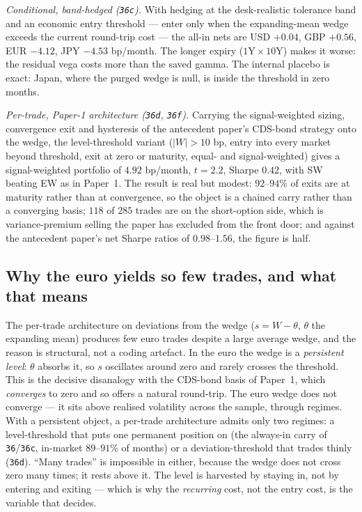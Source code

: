 \documentclass[11pt]{article}
\begin{document}
\emph{Conditional, band-hedged (\texttt{36c}).} With hedging at the desk-realistic tolerance band and
an economic entry threshold --- enter only when the expanding-mean wedge exceeds the current
round-trip cost --- the all-in nets are USD $+0.04$, GBP $+0.56$, EUR $-4.12$, JPY $-4.53$ bp/month.
The longer expiry ($1\mathrm{Y}\times10\mathrm{Y}$) makes it worse: the residual vega costs more than
the saved gamma. The internal placebo is exact: Japan, where the purged wedge is null, is inside the
threshold in zero months.

\emph{Per-trade, Paper-1 architecture (\texttt{36d}, \texttt{36f}).} Carrying the signal-weighted
sizing, convergence exit and hysteresis of the antecedent paper's CDS-bond strategy onto the wedge,
the level-threshold variant ($|W|>10$ bp, entry into every market beyond threshold, exit at zero or
maturity, equal- and signal-weighted) gives a signal-weighted portfolio of $4.92$ bp/month, $t=2.2$,
Sharpe $0.42$, with SW beating EW as in Paper~1. The result is real but modest: $92$--$94\%$ of exits
are at maturity rather than at convergence, so the object is a chained carry rather than a
converging basis; $118$ of $285$ trades are on the short-option side, which is variance-premium
selling the paper has excluded from the front door; and against the antecedent paper's net Sharpe
ratios of $0.98$--$1.56$, the figure is half.

\subsection{Why the euro yields so few trades, and what that means}\label{sec:strat-persist}
The per-trade architecture on deviations from the wedge ($s=W-\theta$, $\theta$ the expanding mean)
produces few euro trades despite a large average wedge, and the reason is structural, not a coding
artefact. In the euro the wedge is a \emph{persistent level}: $\theta$ absorbs it, so $s$ oscillates
around zero and rarely crosses the threshold. This is the decisive disanalogy with the CDS-bond basis
of Paper~1, which \emph{converges} to zero and so offers a natural round-trip. The euro wedge does not
converge --- it sits above realised volatility across the sample, through regimes. With a persistent
object, a per-trade architecture admits only two regimes: a level-threshold that puts one permanent
position on (the always-in carry of \texttt{36}/\texttt{36c}, in-market $89$--$91\%$ of months) or a
deviation-threshold that trades thinly (\texttt{36d}). ``Many trades'' is impossible in either,
because the wedge does not cross zero many times; it rests above it. The level is harvested by staying
in, not by entering and exiting --- which is why the \emph{recurring} cost, not the entry cost, is the
variable that decides.
\end{document}

